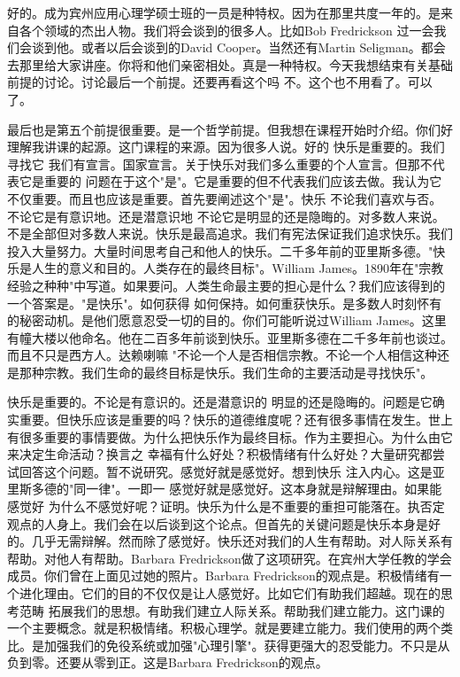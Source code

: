 好的。成为宾州应用心理学硕士班的一员是种特权。因为在那里共度一年的。是来自各个领域的杰出人物。我们将会谈到的很多人。比如Bob Fredrickson 过一会我们会谈到他。或者以后会谈到的David Cooper。当然还有Martin Seligman。都会去那里给大家讲座。你将和他们亲密相处。真是一种特权。今天我想结束有关基础前提的讨论。讨论最后一个前提。还要再看这个吗 不。这个也不用看了。可以了。 

最后也是第五个前提很重要。是一个哲学前提。但我想在课程开始时介绍。你们好理解我讲课的起源。这门课程的来源。因为很多人说。好的 快乐是重要的。我们寻找它 我们有宣言。国家宣言。关于快乐对我们多么重要的个人宣言。但那不代表它是重要的 问题在于这个"是"。它是重要的但不代表我们应该去做。我认为它不仅重要。而且也应该是重要。首先要阐述这个"是"。快乐 不论我们喜欢与否。不论它是有意识地。还是潜意识地 不论它是明显的还是隐晦的。对多数人来说。不是全部但对多数人来说。快乐是最高追求。我们有宪法保证我们追求快乐。我们投入大量努力。大量时间思考自己和他人的快乐。二千多年前的亚里斯多德。"快乐是人生的意义和目的。人类存在的最终目标"。William James。1890年在"宗教经验之种种"中写道。如果要问。人类生命最主要的担心是什么？我们应该得到的一个答案是。"是快乐"。如何获得 如何保持。如何重获快乐。是多数人时刻怀有的秘密动机。是他们愿意忍受一切的目的。你们可能听说过William James。这里有幢大楼以他命名。他在二百多年前谈到快乐。亚里斯多德在二千多年前也谈过。而且不只是西方人。达赖喇嘛 "不论一个人是否相信宗教。不论一个人相信这种还是那种宗教。我们生命的最终目标是快乐。我们生命的主要活动是寻找快乐"。 

快乐是重要的。不论是有意识的。还是潜意识的 明显的还是隐晦的。问题是它确实重要。但快乐应该是重要的吗？快乐的道德维度呢？还有很多事情在发生。世上有很多重要的事情要做。为什么把快乐作为最终目标。作为主要担心。为什么由它来决定生命活动？换言之 幸福有什么好处？积极情绪有什么好处？大量研究都尝试回答这个问题。暂不说研究。感觉好就是感觉好。想到快乐 注入内心。这是亚里斯多德的"同一律"。一即一 感觉好就是感觉好。这本身就是辩解理由。如果能感觉好 为什么不感觉好呢？证明。快乐为什么是不重要的重担可能落在。执否定观点的人身上。我们会在以后谈到这个论点。但首先的关键问题是快乐本身是好的。几乎无需辩解。然而除了感觉好。快乐还对我们的人生有帮助。对人际关系有帮助。对他人有帮助。Barbara Fredrickson做了这项研究。在宾州大学任教的学会成员。你们曾在上面见过她的照片。Barbara Fredrickson的观点是。积极情绪有一个进化理由。它们的目的不仅仅是让人感觉好。比如它们有助我们超越。现在的思考范畴 拓展我们的思想。有助我们建立人际关系。帮助我们建立能力。这门课的一个主要概念。就是积极情绪。积极心理学。就是要建立能力。我们使用的两个类比。是加强我们的免役系统或加强"心理引擎"。获得更强大的忍受能力。不只是从负到零。还要从零到正。这是Barbara Fredrickson的观点。 

